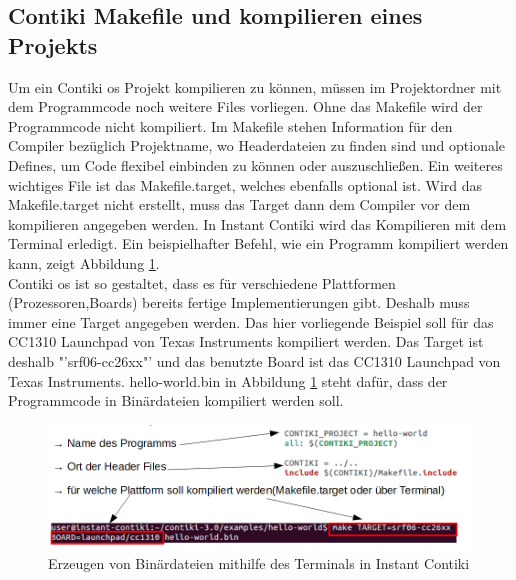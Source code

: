 	\subsection{Contiki Makefile und kompilieren eines Projekts}
	Um ein Contiki \ac{os} Projekt kompilieren zu können, müssen im Projektordner mit dem Programmcode noch weitere Files vorliegen. Ohne das Makefile wird der Programmcode nicht kompiliert. Im Makefile stehen Information für den Compiler bezüglich Projektname, wo Headerdateien zu finden sind und optionale  Defines, um Code flexibel einbinden zu können oder auszuschließen. Ein weiteres wichtiges File ist das Makefile.target, welches ebenfalls optional ist. Wird das Makefile.target nicht erstellt, muss das Target dann dem Compiler vor dem kompilieren angegeben werden. In Instant Contiki wird das Kompilieren mit dem Terminal erledigt. Ein beispielhafter Befehl, wie ein Programm kompiliert werden kann, zeigt Abbildung \ref{Makefile&Kompilieren}. \\
	Contiki \ac{os} ist so gestaltet, dass es für verschiedene Plattformen (Prozessoren,Boards) bereits fertige Implementierungen gibt. Deshalb muss immer eine Target angegeben werden. Das hier vorliegende Beispiel soll für das CC1310 Launchpad von Texas Instruments kompiliert werden. Das Target ist deshalb "'srf06-cc26xx"' und das benutzte Board ist das CC1310 Launchpad von Texas Instruments. hello-world.bin in Abbildung \ref{Makefile&Kompilieren} steht dafür, dass der Programmcode in Binärdateien kompiliert werden soll.
	\begin{figure}
		\centering
		\includegraphics[scale=0.5]{Grafiken-Julian/MakefileKompilieren.png}
		\caption{Erzeugen von Binärdateien mithilfe des Terminals in Instant Contiki}
		\label{Makefile&Kompilieren}
	\end{figure}
